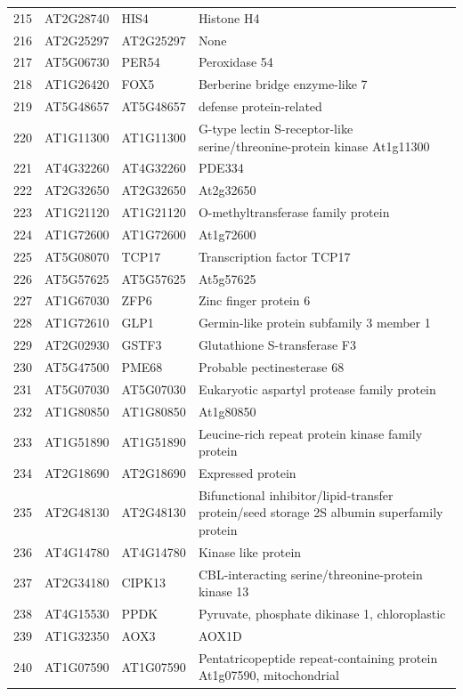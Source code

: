 \documentclass[11pt]{article}
\begin{document}
\begin{center}
\begin{tabular}{rlll}
215 & AT2G28740 & HIS4 & Histone H4\\
216 & AT2G25297 & AT2G25297 & None\\
217 & AT5G06730 & PER54 & Peroxidase 54\\
218 & AT1G26420 & FOX5 & Berberine bridge enzyme-like 7\\
219 & AT5G48657 & AT5G48657 & defense protein-related\\
220 & AT1G11300 & AT1G11300 & G-type lectin S-receptor-like serine/threonine-protein kinase At1g11300\\
221 & AT4G32260 & AT4G32260 & PDE334\\
222 & AT2G32650 & AT2G32650 & At2g32650\\
223 & AT1G21120 & AT1G21120 & O-methyltransferase family protein\\
224 & AT1G72600 & AT1G72600 & At1g72600\\
225 & AT5G08070 & TCP17 & Transcription factor TCP17\\
226 & AT5G57625 & AT5G57625 & At5g57625\\
227 & AT1G67030 & ZFP6 & Zinc finger protein 6\\
228 & AT1G72610 & GLP1 & Germin-like protein subfamily 3 member 1\\
229 & AT2G02930 & GSTF3 & Glutathione S-transferase F3\\
230 & AT5G47500 & PME68 & Probable pectinesterase 68\\
231 & AT5G07030 & AT5G07030 & Eukaryotic aspartyl protease family protein\\
232 & AT1G80850 & AT1G80850 & At1g80850\\
233 & AT1G51890 & AT1G51890 & Leucine-rich repeat protein kinase family protein\\
234 & AT2G18690 & AT2G18690 & Expressed protein\\
235 & AT2G48130 & AT2G48130 & Bifunctional inhibitor/lipid-transfer protein/seed storage 2S albumin superfamily protein\\
236 & AT4G14780 & AT4G14780 & Kinase like protein\\
237 & AT2G34180 & CIPK13 & CBL-interacting serine/threonine-protein kinase 13\\
238 & AT4G15530 & PPDK & Pyruvate, phosphate dikinase 1, chloroplastic\\
239 & AT1G32350 & AOX3 & AOX1D\\
240 & AT1G07590 & AT1G07590 & Pentatricopeptide repeat-containing protein At1g07590, mitochondrial\\

\end{tabular}
\end{center}
\end{document}
